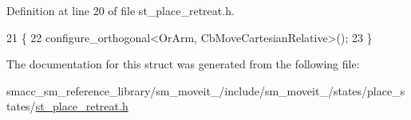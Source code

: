Definition at line 20 of file st\+\_\+place\+\_\+retreat.\+h.


\begin{DoxyCode}
21     \{
22         configure\_orthogonal<OrArm, CbMoveCartesianRelative>();
23     \}
\end{DoxyCode}


The documentation for this struct was generated from the following file\+:\begin{DoxyCompactItemize}
\item 
smacc\+\_\+sm\+\_\+reference\+\_\+library/sm\+\_\+moveit\+\_/include/sm\+\_\+moveit\+\_/states/place\+\_\+states/\hyperlink{4_2include_2sm__moveit__4_2states_2place__states_2st__place__retreat_8h}{st\+\_\+place\+\_\+retreat.\+h}\end{DoxyCompactItemize}
